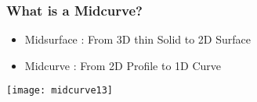 \begin{frame}[fragile]\frametitle{What is a Midcurve?}

	\begin{itemize}
	\item Midsurface : From 3D thin Solid to 2D Surface
	\item Midcurve : From 2D Profile to 1D Curve
	\end{itemize}
\begin{center}
\texttt{[image: midcurve13]}
\end{center}	
\end{frame}